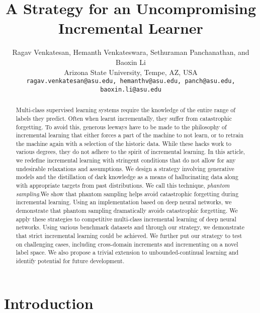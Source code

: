 \documentclass[10pt,twocolumn,letterpaper]{article}
\begin{document}
	
	\title{A Strategy for an Uncompromising Incremental Learner}
	
	\author{Ragav Venkatesan, Hemanth Venkateswara, Sethuraman Panchanathan, and Baoxin Li
		\\
		Arizona State University, Tempe, AZ, USA \\
		{\tt\small ragav.venkatesan@asu.edu, hemanthv@asu.edu, panch@asu.edu, baoxin.li@asu.edu}}
	
	\maketitle
	
	
	
	
	
	\begin{abstract}
		Multi-class supervised learning systems require the knowledge of the entire range of labels they predict. Often when learnt incrementally, they suffer from catastrophic forgetting. To avoid this, generous leeways have to be made to the philosophy of incremental learning that either forces a part of the machine to not learn, or to retrain the machine again with a selection of the historic data. While these hacks work to various degrees, they do not adhere to the spirit of incremental learning. In this article, we redefine incremental learning with stringent conditions that do not allow for any undesirable relaxations and assumptions. We design a strategy involving generative models and the distillation of dark knowledge as a means of hallucinating data along with appropriate targets from past distributions. We call this technique, \emph{phantom sampling}.We show that phantom sampling helps avoid catastrophic forgetting during incremental learning. Using an implementation based on deep neural networks, we demonstrate that phantom sampling dramatically avoids catastrophic forgetting. We apply these strategies to competitive multi-class incremental learning of deep neural networks. Using various benchmark datasets and through our strategy, we demonstrate that strict incremental learning could be achieved. We further put our strategy to test on challenging cases, including cross-domain increments and incrementing on a novel label space. We also propose a trivial extension to unbounded-continual learning and identify potential for future development.
		
	\end{abstract}
	
	
	
	
	\section{Introduction}
	\label{sec:intro}
	
\end{document}
